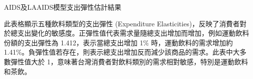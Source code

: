 %     

\begin{table}[H]
    \caption{AIDS及LAAIDS模型支出彈性估計結果} \label{exp}
    \center
    \footnotesize
    
\end{table}
\vspace{-2em}
\begin{singlespace}
    \begin{footnotesize}
        \raggedright
         此表格顯示五種飲料類型的支出彈性 (Expenditure Elasticities)，反映了消費者對於總支出變化的敏感度。正彈性值代表需求量隨總支出增加而增加，例如運動飲料份額的支出彈性為 1.412，表示當總支出增加 1\% 時，運動飲料的需求增加約 1.41\%。負彈性值若存在，則表示總支出增加反而減少該商品的需求。此表中大多數彈性值大於 1，意味著台灣消費者對飲料類別的需求相對敏感，特別是運動飲料和茶飲。
    \end{footnotesize}
\end{singlespace}

